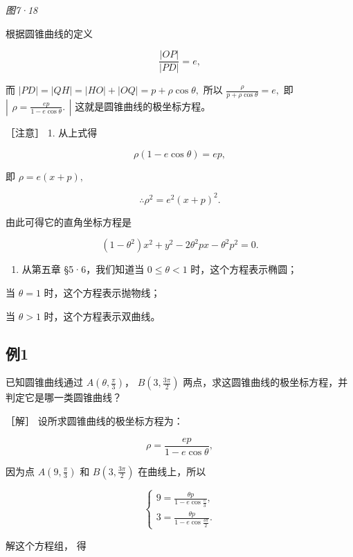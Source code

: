 \emph{图7·18}

根据圆锥曲线的定义

\[
\frac {| OP |}{| PD |} = e,
\]

而 \(|PD| = |QH| = |HO| + |OQ| = p + \rho \cos \theta,\) 所以
\(\frac{\rho}{p + \rho\cos\theta} = e,\) 即
\(\left| \begin{array}{l} \rho = \frac{e p}{1 - e \cos \theta}. \end{array} \right|\)
这就是圆锥曲线的极坐标方程。

［注意］ 1. 从上式得

\[
\rho (1 - e \cos \theta) = e p,
\]

即 \(\rho = e(x + p),\)

\[
\therefore \rho^{2} = e^{2} (x + p) ^ {2}.
\]

由此可得它的直角坐标方程是

\[
(1 - \theta^{2}) x^{2} + y^{2} - 2 \theta^{2} p x - \theta^{2} p^{2} = 0.
\]

\begin{enumerate}
\def\labelenumi{\arabic{enumi}.}
\setcounter{enumi}{1}
\tightlist
\item
  从第五章 §5·6，我们知道当 \(0 \leqslant \theta < 1\)
  时，这个方程表示椭圆；
\end{enumerate}

当 \(\theta = 1\) 时，这个方程表示抛物线；

当 \(\theta > 1\) 时，这个方程表示双曲线。

\subsection{例1}\label{ux4f8b1-50}

已知圆锥曲线通过 \(A\left(\theta, \frac{\pi}{3}\right)\)，
\(B\left(3, \frac{3\pi}{2}\right)\)
两点，求这圆锥曲线的极坐标方程，并判定它是哪一类圆锥曲线？

［解］ 设所求圆锥曲线的极坐标方程为：

\[
\rho = \frac {e p}{1 - e \cos \theta}, \tag {1}
\]

因为点 \(A\left(9, \frac{\pi}{3}\right)\) 和
\(B\left(3, \frac{3\pi}{2}\right)\) 在曲线上，所以

\[
\left\{ \begin{array}{l} 9 = \frac {\theta p}{1 - e \cos \frac {\pi}{3}}, \\ 3 = \frac {\theta p}{1 - e \cos \frac {3 \pi}{2}}. \end{array} \right.
\]

解这个方程组， 得

